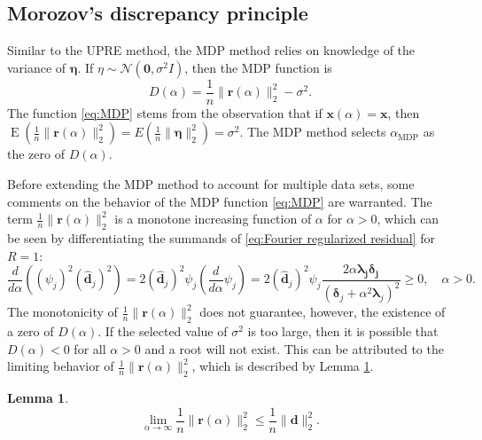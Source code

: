 \documentclass[12pt]{article}
\newcommand{\dVec}{\mathbf{d}}	%
\newcommand{\rVec}{\mathbf{r}}	%
\newcommand{\xVec}{\mathbf{x}}	%
\newcommand{\dft}[1]{\widehat{#1}}	%
\newcommand{\regparam}{\alpha}
\newcommand{\xReg}{\xVec(\regparam)}	%
\newcommand{\mfilt}{\psi}
\newcommand{\noise}{\eta}	%
\newcommand{\noiseSD}{\sigma}	%
\newcommand{\noiseVec}{\bm{\noise}}	%
\DeclareMathOperator{\E}{E}	%
\newcommand{\D}{D}	%
\newcommand{\MDP}{\text{MDP}}	%
\newtheorem{lemma}{Lemma}[section]
\begin{document}
\subsection{Morozov's discrepancy principle} \label{sec:MDP}
Similar to the UPRE method, the MDP method relies on knowledge of the variance of $\noiseVec$. If $\noise \sim \mathcal{N}(\bm{0},\noiseSD^2I)$, then the MDP function is 
\begin{equation}
\label{eq:MDP}
\D(\regparam) = \frac{1}{n}\|\rVec(\regparam)\|_2^2 - \noiseSD^2.
\end{equation}
The function \eqref{eq:MDP} stems from the observation that if $\xReg = \xVec$, then $\E(\frac{1}{n}\|\rVec(\regparam)\|_2^2) = E(\frac{1}{n}\|\noiseVec\|_2^2) = \noiseSD^2$. The MDP method selects $\regparam_{\MDP}$ as the zero of $\D(\regparam)$.  \par 
Before extending the MDP method to account for multiple data sets, some comments on the behavior of the MDP function \eqref{eq:MDP} are warranted. The term $\frac{1}{n}\|\rVec(\regparam)\|_2^2$ is a monotone increasing function of $\regparam$ for $\regparam > 0$, which can be seen by differentiating the summands of \eqref{eq:Fourier regularized residual} for $R = 1$:
\[\frac{d}{d\regparam}\left(\left(\mfilt_j\right)^2\left(\dft{\dVec}_j\right)^2\right) = 2 \left(\dft{\dVec}_j\right)^2 \mfilt_j\left(\frac{d}{d\regparam}\mfilt_j\right) = 2 \left(\dft{\dVec}_j\right)^2 \mfilt_j \frac{2\regparam\bm{\lambda_j}\bm{\delta_j}}{\left(\bm{\delta}_j + \regparam^2 \bm{\lambda}_j\right)^2} \geq 0, \quad \regparam > 0.\]
The monotonicity of $\frac{1}{n}\|\rVec(\regparam)\|_2^2$ does not guarantee, however, the existence of a zero of $\D(\regparam)$. If the selected value of $\noiseSD^2$ is too large, then it is possible that $\D(\regparam) < 0$ for all $\regparam > 0$ and a root will not exist. This can be attributed to the limiting behavior of $\frac{1}{n}\|\rVec(\regparam)\|_2^2$, which is described by Lemma \ref{lem:Residual limit}.
\begin{lemma}
\label{lem:Residual limit}
\[\lim_{\regparam\rightarrow\infty} \frac{1}{n}\|\rVec(\regparam)\|_2^2 \leq \frac{1}{n}\|\dVec\|_2^2.\]
\end{lemma}
\end{document}

